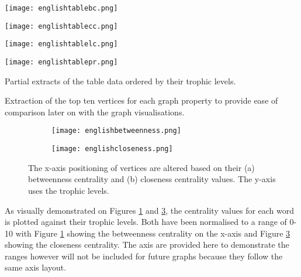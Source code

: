 \begin{table}[H]
\centering
\begin{subtable}{.2\textwidth}
	\centering
	\texttt{[image: englishtablebc.png]}
	\caption{}
	\label{table:englishtablebc}
\end{subtable}
\hfill
\begin{subtable}{.2\textwidth}
	\centering
	\texttt{[image: englishtablecc.png]}
	\caption{}
	\label{table:englishtablecc}
\end{subtable}
\hfill
\begin{subtable}{.2\textwidth}
	\centering
	\texttt{[image: englishtablelc.png]}
	\caption{}
	\label{table:englishtablelc}
\end{subtable}
\hfill
\begin{subtable}{.2\textwidth}
	\centering
	\texttt{[image: englishtablepr.png]}
	\caption{}
	\label{table:englishtablepr}
\end{subtable}
\caption{Partial extracts of the table data ordered by their trophic levels.}
\end{table}

Extraction of the top ten vertices for each graph property to provide ease of comparison later on with the graph visualisations.

\begin{figure}[H]
\centering
\begin{subfigure}{.45\textwidth}
	\hspace{-1cm} 
	\texttt{[image: englishbetweenness.png]}
	\caption{}
	\label{fig:engbc}
\end{subfigure}
\hfill
\begin{subfigure}{.45\textwidth}
	\hspace{-1cm} 
	\texttt{[image: englishcloseness.png]}
	\caption{}
	\label{fig:engcc}
\end{subfigure}
\caption{The x-axis positioning of vertices are altered based on their (a) betweenness centrality and (b) closeness centrality values. The y-axis uses the trophic levels.}
\end{figure}

As visually demonstrated on Figures \ref{fig:engbc} and \ref{fig:engcc}, the centrality values for each word is plotted against their trophic levels. Both have been normalised to a range of 0-10 with Figure \ref{fig:engbc} showing the betweenness centrality on the x-axis and Figure \ref{fig:engcc} showing the closeness centrality. The axis are provided here to demonstrate the ranges however will not be included for future graphs because they follow the same axis layout.

